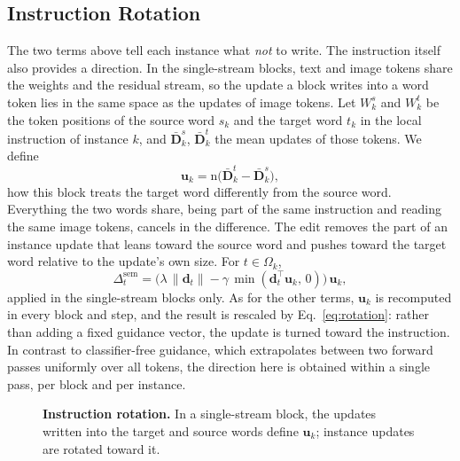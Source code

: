 \subsection{Instruction Rotation}  %
\label{sec:semantic}

The two terms above tell each instance what \emph{not} to write. The instruction itself also provides a
direction. In the single-stream blocks, text and image tokens share the weights and the residual stream, so
the update a block writes into a word token lies in the same space as the updates of image tokens. Let
$W^{s}_k$ and $W^{t}_k$ be the token positions of the source word $s_k$ and the target word $t_k$ in the local
instruction of instance $k$, and $\bar{\mathbf{D}}^{s}_k$, $\bar{\mathbf{D}}^{t}_k$ the mean updates of those
tokens. We define
\begin{equation}
  \mathbf{u}_k = \mathrm{n}\big(\bar{\mathbf{D}}^{t}_k - \bar{\mathbf{D}}^{s}_k\big),
\end{equation}
how this block treats the target word differently from the source word. Everything the two words share,
being part of the same instruction and reading the same image tokens, cancels in the difference. The edit
removes the part of an instance update that leans toward the source word and pushes toward the target word
relative to the update's own size. For $t \in \Omega_k$,
\begin{equation}
  \Delta^{\mathrm{sem}}_t = \big(\lambda\,\lVert\mathbf{d}_t\rVert
     - \gamma\,\min(\mathbf{d}_t^{\top}\mathbf{u}_k,\,0)\big)\,\mathbf{u}_k ,
\end{equation}
applied in the single-stream blocks only. As for the other terms, $\mathbf{u}_k$ is recomputed in every block
and step, and the result is rescaled by Eq.~\eqref{eq:rotation}: rather than adding a fixed guidance vector,
the update is turned toward the instruction. In contrast to classifier-free guidance, which extrapolates
between two forward passes uniformly over all tokens, the direction here is obtained within a single pass,
per block and per instance.

\begin{figure}[t]
  \centering
  \caption{\textbf{Instruction rotation.} In a single-stream block, the updates written into the target and
  source words define $\mathbf{u}_k$; instance updates are rotated toward it.}
  \label{fig:semantic}
\end{figure}

